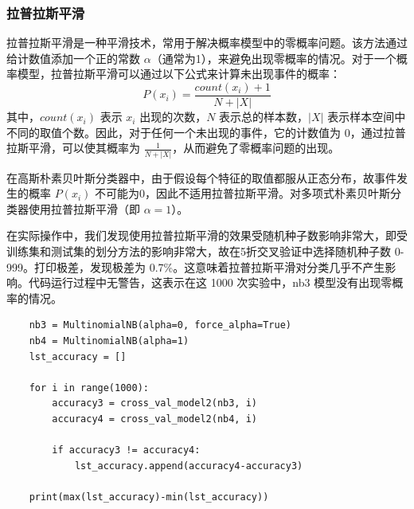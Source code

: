 \documentclass[a4paper,12pt,onecolumn,oneside]{article}
\begin{document}
\subsubsection{拉普拉斯平滑}\label{6.2.3}
拉普拉斯平滑是一种平滑技术，常用于解决概率模型中的零概率问题。该方法通过给计数值添加一个正的常数 $\alpha$（通常为1），来避免出现零概率的情况。对于一个概率模型，拉普拉斯平滑可以通过以下公式来计算未出现事件的概率：
\begin{equation*}
	P(x_i) = \frac{count(x_i) + 1}{N + |X|}
\end{equation*}
其中，$count(x_i)$ 表示 $x_i$ 出现的次数，$N$ 表示总的样本数，$|X|$ 表示样本空间中不同的取值个数。因此，对于任何一个未出现的事件，它的计数值为 0，通过拉普拉斯平滑，可以使其概率为 $\frac{1}{N + |X|}$，从而避免了零概率问题的出现。\par 
在高斯朴素贝叶斯分类器中，由于假设每个特征的取值都服从正态分布，故事件发生的概率 $P(x_i)$ 不可能为0，因此不适用拉普拉斯平滑。对多项式朴素贝叶斯分类器使用拉普拉斯平滑（即 $\alpha=1$）。\par 
在实际操作中，我们发现使用拉普拉斯平滑的效果受随机种子数影响非常大，即受训练集和测试集的划分方法的影响非常大，故在5折交叉验证中选择随机种子数 0-999。打印极差，发现极差为 0.7\%。这意味着拉普拉斯平滑对分类几乎不产生影响。代码运行过程中无警告，这表示在这 1000 次实验中，nb3 模型没有出现零概率的情况。
\vspace{\baselineskip}
\lstset{language=Python}
\lstset{frame=lines}
\lstset{basicstyle=\footnotesize}
\begin{lstlisting}
	nb3 = MultinomialNB(alpha=0, force_alpha=True)
	nb4 = MultinomialNB(alpha=1)
	lst_accuracy = []
	
	for i in range(1000):
		accuracy3 = cross_val_model2(nb3, i)
		accuracy4 = cross_val_model2(nb4, i)
	
		if accuracy3 != accuracy4:
			lst_accuracy.append(accuracy4-accuracy3)
	
	print(max(lst_accuracy)-min(lst_accuracy))
\end{lstlisting}

\vspace{3\baselineskip}
\end{document}
